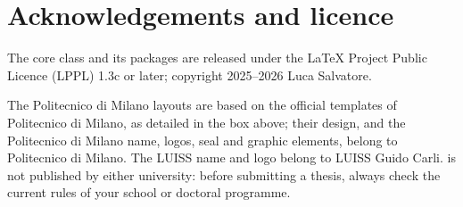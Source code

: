 \documentclass[11pt,a4paper]{article}
\begin{document}
\section*{Acknowledgements and licence}

The  core class and its packages are released under
the \LaTeX{} Project Public Licence (LPPL) 1.3c or later; copyright
2025--2026 Luca Salvatore.

The Politecnico di Milano layouts are based on the official templates of
Politecnico di Milano, as detailed in the box above; their design, and the
Politecnico di Milano name, logos, seal and graphic elements, belong to
Politecnico di Milano. The LUISS name and logo belong to LUISS Guido Carli.
 is not published by either university: before
submitting a thesis, always check the current rules of your school or
doctoral programme.
\end{document}
